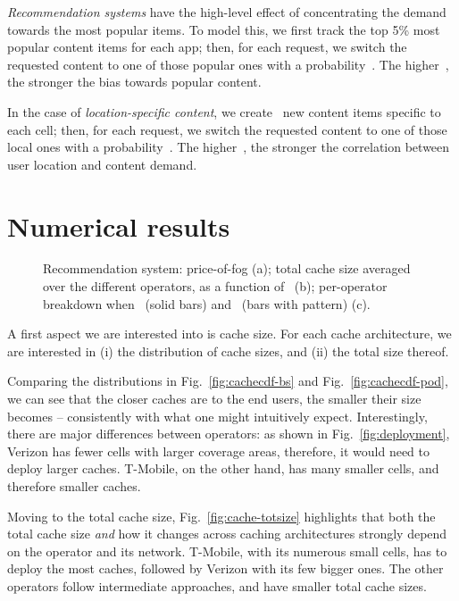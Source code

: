 \documentclass{sig-alternate-05-2015}
\newcommand{\Fig}[1]{Fig.~\ref{fig:#1}}
\begin{document}
\noindent
{\em Recommendation systems} have the high-level effect of concentrating the demand towards the most popular items. To model this, we first track the top 5\% most popular content items for each app; then, for each request, we switch the requested content to one of those popular ones with a probability~. The higher~, the stronger the bias towards popular content.

\noindent
In the case of {\em location-specific content}, we create~ new content items specific to each cell; then, for each request, we switch the requested content to one of those local ones with a probability~. The higher~, the stronger the correlation between user location and content demand.

\section{Numerical results}
\label{sec:results}

\begin{figure*}[]
\centering
{}   \caption{Recommendation system: price-of-fog (a); total cache size averaged
over the different operators, as a function of~ (b); per-operator breakdown when~ (solid bars) and~ (bars with pattern) (c).
\vspace*{-3mm}
} \end{figure*}

A first aspect we are interested into is cache size. For each cache architecture, we are interested in (i) the distribution of cache sizes, and (ii) the total size thereof.

Comparing the distributions in \Fig{cachecdf-bs} and
\Fig{cachecdf-pod}, we can see that the closer caches are to the end users, the smaller their size becomes -- consistently with what one might intuitively expect.
Interestingly,
there are major differences between operators: as shown in
\Fig{deployment}, Verizon has fewer cells with larger coverage areas,
therefore, it would need to deploy larger caches. T-Mobile, on the other hand, has many smaller cells, and therefore smaller caches.

Moving to the total cache size, \Fig{cache-totsize} highlights that both the total cache size {\em and} how it changes across caching architectures strongly depend on the operator and its network. T-Mobile, with its numerous small cells, has to deploy the most caches, followed by Verizon with its few bigger ones. The other operators follow intermediate approaches, and have smaller total cache sizes.
\end{document}
